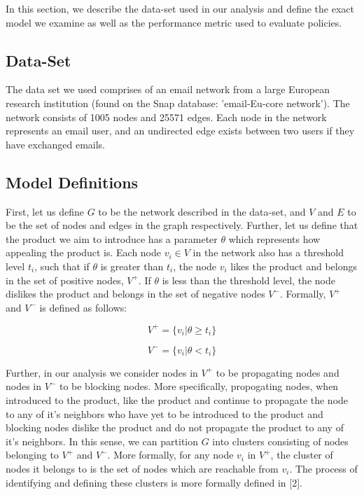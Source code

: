 In this section, we describe the data-set used in our analysis and define the exact model we examine as well as the performance metric used to evaluate policies. 

\subsection{Data-Set}

The data set we used comprises of an email network from a large European research institution (found on the Snap database: 'email-Eu-core network'). The network consists of 1005 nodes and 25571 edges. Each node in the network represents an email user, and an undirected edge exists between two users if they have exchanged emails. 

\subsection{ Model Definitions }

First, let us define $G$ to be the network described in the data-set, and $V$ and $E$ to be the set of nodes and edges in the graph respectively. Further, let us define that the product we aim to introduce has a parameter $\theta$ which represents how appealing the product is. Each node $v_i \in V$ in the network also has a threshold level $t_i$, such that if $\theta$ is greater than $t_i$, the node $v_i$ likes the product and belongs in the set of positive nodes, $V^+$. If $\theta$ is less than the threshold level, the node dislikes the product and belongs in the set of negative nodes $V^-$. Formally, $V^+$ and $V^-$ is defined as follows:

\begin{equation}
    V^+= \{ v_i | \theta \ge t_i\}
\end{equation} 

\begin{equation}
    V^-= \{ v_i | \theta < t_i\}
\end{equation} 

Further, in our analysis we consider nodes in $V^+$ to be propagating nodes  and nodes in $V^-$ to be blocking nodes. More specifically, propogating nodes, when introduced to the product, like the product and continue to propagate the node to any of it's neighbors who have yet to be introduced to the product and blocking nodes dislike the product and do not propagate the product to any of it's neighbors. In this sense, we can partition $G$ into clusters consisting of nodes belonging to $V^+$ and $V^-$. More formally, for any node $v_i$ in $V^+$, the cluster of nodes it belongs to is the set of nodes which are reachable from $v_i$. The process of identifying and defining these clusters is more formally defined in [2]. 


